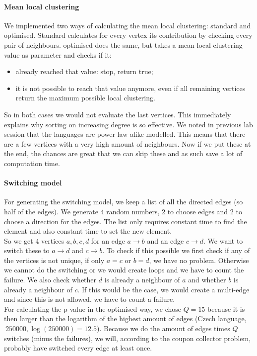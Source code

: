 \documentclass[paper=a4, fontsize=11pt]{scrartcl} %
\begin{document}
\paragraph{Mean local clustering}
We implemented two ways of calculating the mean local clustering: standard and optimised. Standard calculates for every vertex its contribution by checking every pair of neighbours. optimised does the same, but takes a mean local clustering value as parameter and checks if it:
\begin{itemize}
\item already reached that value: stop, return true;
\item it is not possible to reach that value anymore, even if all remaining vertices return the maximum possible local clustering.
\end{itemize}
So in both cases we would not evaluate the last vertices. This immediately explains why sorting on increasing degree is so effective. We noted in previous lab session that the languages are power-law-alike modelled. This means that there are a few vertices with a very high amount of neighbours. Now if we put these at the end, the chances are great that we can skip these and as such save a lot of computation time.

\paragraph{Switching model}
For generating the switching model, we keep a list of all the directed edges (so half of the edges). We generate $4$ random numbers, $2$ to choose edges and $2$ to choose a direction for the edges. The list only requires constant time to find the element and also constant time to set the new element.\\

So we get $4$ vertices $a,b,c,d$ for an edge $a\rightarrow b$ and an edge $c\rightarrow d$. We want to switch these to $a\rightarrow d$ and $c \rightarrow b$. To check if this possible we first check if any of the vertices is not unique, if only $a=c$ or $b=d$, we have no problem. Otherwise we cannot do the switching or we would create loops and we have to count the failure.
We also check whether $d$ is already a neighbour of $a$ and whether $b$ is already a neighbour of $c$. If this would be the case, we would create a multi-edge and since this is not allowed, we have to count a failure.\\

For calculating the p-value in the optimised way, we chose $Q=15$ because it is then larger than the logarithm of the highest amount of edges (Czech language, $~250000, \log{(250000)}=12.5$). Because we do the amount of edges times $Q$ switches (minus the failures), we will, according to the coupon collector problem, probably have switched every edge at least once.
\end{document}
